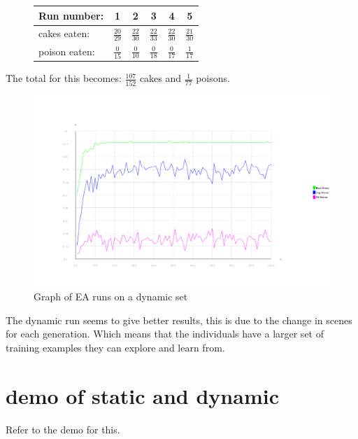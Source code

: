 \documentclass[12pt, a4paper]{article}
\begin{document}
\begin{figure}[H]
	\begin{center}
	\begin{tabular}{l| c|c|c|c|c}
	Run number: &  1&2 &3 &4 &5 \\ \hline
cakes eaten: &$ \frac{20}{29} $ &$ \frac{22}{30} $ &$ \frac{22}{33} $ &$ \frac{22}{30} $ &$ \frac{21}{30} $ \\ \hline
poison eaten: &$ \frac{0}{15} $ &$ \frac{0}{10} $ &$ \frac{0}{18} $ &$ \frac{0}{17} $ &$ \frac{1}{17} $ \\ \hline
	\end{tabular}
	\end{center}
\end{figure}
The total for this becomes: $ \frac{107}{152} $ cakes and $ \frac{1}{77} $ poisons.  
\begin{figure}[H]
\includegraphics[width=0.9\linewidth]{flatlandfalse}
\caption{Graph of EA runs on a dynamic set}
\end{figure}

The dynamic run seems to give better results, this is due to the change in scenes for each generation. Which means that the individuals have a larger set of training examples they can explore and learn from.
\section{demo of static and dynamic}
Refer to the demo for this.
\end{document}
